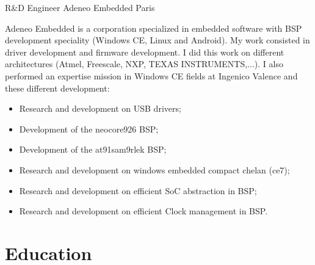 \documentclass[11pt,a4paper,sans]{moderncv}
\begin{document}
{R\&D Engineer}
{Adeneo Embedded}
{Paris}
{}
{Adeneo Embedded is a corporation specialized in embedded software with BSP
development speciality (Windows CE, Linux and Android).
My work consisted in driver development and firmware development.
I did this work on different architectures (Atmel, Freescale,
NXP, TEXAS INSTRUMENTS,...).
I also performed an expertise mission in Windows CE fields at Ingenico
Valence and these different development:
\begin{itemize}
\item Research and development on USB drivers;
\item Development of the neocore926 BSP;
\item Development of the at91sam9rlek BSP;
\item Research and development on windows embedded compact chelan (ce7);
\item Research and development on efficient SoC abstraction in BSP;
\item Research and development on efficient Clock management in BSP.
\end{itemize}
}


\section{Education}
\end{document}

